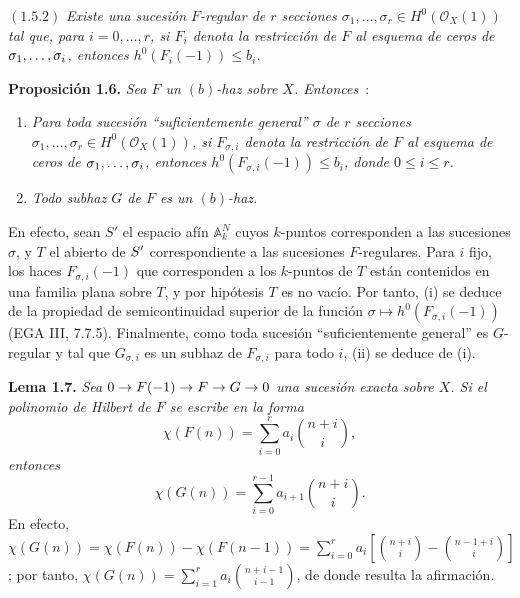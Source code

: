 \((1.5.2)\) \emph{Existe una sucesión \(F\)-regular de \(r\) secciones
\(\sigma_1,\ldots,\sigma_r\in H^0(\mathcal O_X(1))\) tal que, para
\(i=0,\ldots,r\), si \(F_i\) denota la restricción de \(F\) al esquema de
ceros de \(\sigma_1,\ldots,\sisi{\sigma_1}{\sigma_i}\), entonces %
\(h^0(F_i(-1))\le b_i\).}

\textbf{Proposición 1.6.} \emph{Sea \(F\) un \((b)\)-haz sobre \(X\).
Entonces}~:
\begin{enumerate}[label=(\roman*)]
\item \emph{Para toda sucesión ``suficientemente general'' \(\sigma\) de
\(r\) secciones \(\sigma_1,\ldots,\sigma_r\in H^0(\mathcal O_X(1))\), si
\(F_{\sigma,i}\) denota la restricción de \(F\) al esquema de ceros de
\(\sigma_1,\ldots,\sisi{\sigma_1}{\sigma_i}\), entonces
\(h^0(F_{\sigma,i}(-1))\le b_i\), donde \(0\le i\le r\).}
\item \emph{Todo subhaz \(G\) de \(F\) es un \((b)\)-haz.}
\end{enumerate}

En efecto, sean \(S'\) el espacio afín \(\mathbb A_k^N\) cuyos \(k\)-puntos
corresponden a las sucesiones \(\sigma\), y \(T\) el abierto de \(\sisi{S}{S'}\) %
correspondiente a las sucesiones \(F\)-regulares. Para \(i\) fijo, los haces
\(F_{\sigma,i}(-1)\) que corresponden a los \(k\)-puntos de \(T\) están
contenidos en una familia plana sobre \(T\), y por hipótesis \(T\) es no
vacío. Por tanto, (i) se deduce de la propiedad de semicontinuidad superior
de la función $\sigma\longmapsto h^0(F_{\sigma,i}(-1))$ (EGA III, 7.7.5).
Finalmente, como toda sucesión ``suficientemente general'' es \(G\)-regular
y tal que \(G_{\sigma,i}\) es un subhaz de \(F_{\sigma,i}\) para todo \(i\),
(ii) se deduce de (i).

\textbf{Lema 1.7.} \emph{Sea \(0\to F(\sisi{1}{-1})\to F\to G\to0\) una sucesión %
exacta sobre \(X\). Si el polinomio de Hilbert de \(F\) se escribe en la
forma}
\[
 \chi(F(n))=\sum_{i=0}^{r}a_i\binom{n+i}{i},
\]
\emph{entonces}
\[
 \chi(G(n))=\sum_{i=0}^{r-1}a_{i+1}\binom{n+i}{i}.
\]
En efecto,
\(\chi(G(n))=\chi(F(n))-\chi(F(n-1))=\sum_{i=0}^{r}a_i\left[\binom{n+i}{i}-\binom{n-1+i}{i}\right]\);
por tanto, \(\chi(G(n))=\sum_{i=1}^{r}a_i\binom{n+i-1}{i-1}\), de donde
resulta la afirmación.

